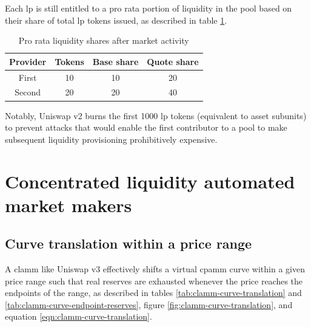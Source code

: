 \documentclass[table, twocolumn]{article}
\begin{document}
Each \gls{lp} is still entitled to a pro rata portion of liquidity in the pool based on
their share of total \gls{lp} tokens issued, as described in table
\ref{tab:lp-pro-rata-shares}.

\begin{table}[!htb]
  \centering
  \begin{tabular}{|c|c|c|c|}
    \hline \rowcolor{blue}
    Provider & Tokens & Base share & Quote share \\ \hline
    First    & 10     & 10         & 20          \\ \hline
    Second   & 20     & 20         & 40          \\ \hline
  \end{tabular}
  \caption{Pro rata liquidity shares after market activity}
  \label{tab:lp-pro-rata-shares}
\end{table}

Notably, Uniswap v2 burns the first 1000 \gls{lp} tokens (equivalent to asset subunits)
to prevent attacks that would enable the first contributor to a pool to make subsequent
liquidity provisioning prohibitively expensive.

\section{Concentrated liquidity automated market makers}

\subsection{Curve translation within a price range}

A \gls{clamm} like Uniswap v3 effectively shifts a virtual \gls{cpamm} curve within a
given price range such that real reserves are exhausted whenever the price reaches the
endpoints of the range, as described in tables \ref{tab:clamm-curve-translation} and
\ref{tab:clamm-curve-endpoint-reserves}, figure \ref{fig:clamm-curve-translation}, and
equation \ref{eqn:clamm-curve-translation}.
\end{document}
